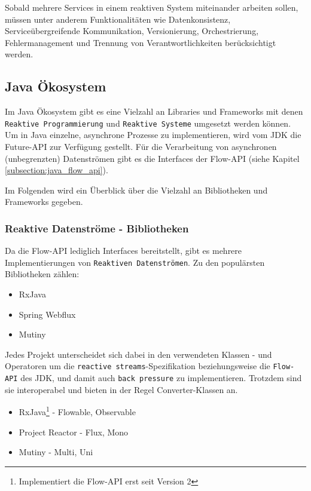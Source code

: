 Sobald mehrere Services in einem reaktiven System miteinander arbeiten sollen, müssen unter anderem Funktionalitäten wie
Datenkonsistenz, Serviceübergreifende Kommunikation, Versionierung, Orchestrierung, Fehlermanagement und Trennung von Verantwortlichkeiten
berücksichtigt werden.

\subsection{Java Ökosystem}
\label{subsec:java_ökosystem}
Im Java Ökosystem gibt es eine Vielzahl an Libraries und Frameworks mit denen
\verb|Reaktive Programmierung| und \verb|Reaktive Systeme| umgesetzt werden können.
Um in Java einzelne, asynchrone Prozesse zu implementieren, wird vom JDK die Future-API zur Verfügung gestellt.\parencite{OracleFuture}
Für die Verarbeitung von asynchronen (unbegrenzten) Datenströmen gibt es die Interfaces der Flow-API (siehe Kapitel \ref{subsection:java_flow_api}).
\parencite{OracleFlow}

Im Folgenden wird ein Überblick über die Vielzahl an Bibliotheken und Frameworks gegeben.

\subsubsection{Reaktive Datenströme - Bibliotheken}
\label{subsubsec:reactive_streams}
Da die Flow-API lediglich Interfaces bereitstellt, gibt es mehrere Implementierungen von \verb|Reaktiven Datenströmen|.
Zu den populärsten Bibliotheken zählen:
\begin{itemize}
  \item RxJava
  \item Spring Webflux
  \item Mutiny
\end{itemize}
Jedes Projekt unterscheidet sich dabei in den verwendeten Klassen - und Operatoren um die \verb|reactive streams|-Spezifikation
beziehungsweise die \verb|Flow-API| des JDK, und damit auch \verb|back pressure| zu implementieren.
Trotzdem sind sie interoperabel und bieten in der Regel Converter-Klassen an.
\begin{itemize}
  \item RxJava\footnote{Implementiert die Flow-API erst seit Version 2} - Flowable, Observable \parencite{RxJava}
  \item Project Reactor - Flux, Mono \parencite{ProjectReactor}
  \item Mutiny - Multi, Uni \parencite{Mutiny}
\end{itemize}


